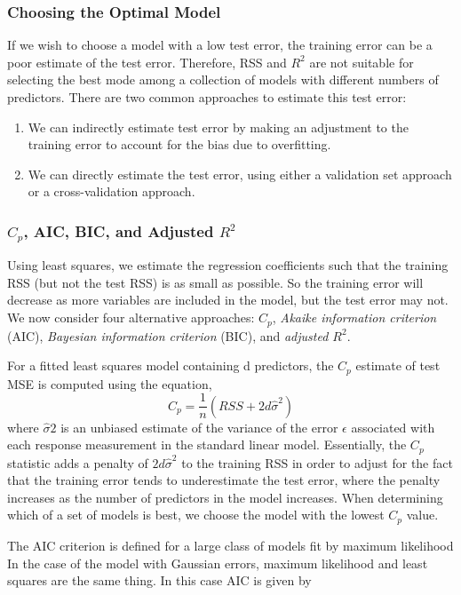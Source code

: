 \documentclass{article}
\numberwithin{equation}{section}
\begin{document}
\begin{enumerate}
\subsubsection{Choosing the Optimal Model}
If we wish to choose a model with a low test error, the training error can be a poor estimate of the test error. Therefore, RSS and $R^2$ are not suitable for selecting the best mode among a collection of models with different numbers of predictors. There are two common approaches to estimate this test error:
\begin{enumerate}
    \item We can indirectly estimate test error by making an adjustment to the training error to account for the bias due to overfitting.
    \item  We can directly estimate the test error, using either a validation set approach or a cross-validation approach.
\end{enumerate}

\subsubsection*{\texorpdfstring{$C_p$}{Cp}, AIC, BIC, and Adjusted \texorpdfstring{$R^2$}{ R2}}
Using least squares, we  estimate the regression coefficients such that the training RSS (but not the test RSS) is as small as possible. So the training error will decrease as more variables are included in the model, but the test error may not. We now consider four alternative approaches: $C_p$, \textit{Akaike information criterion} (AIC), \textit{Bayesian information criterion} (BIC), and \textit{adjusted $R^2$}.

For a fitted least squares model containing d predictors, the $C_p$ estimate of test MSE is computed using the equation,
\begin{equation}
    C_p = \frac{1}{n}(RSS + 2d\hat\sigma^2)
\end{equation}
where $\hat\sigma2$ is an unbiased estimate of the variance of the error $\epsilon$ associated with each response measurement in the standard linear model. Essentially, the $C_p$ statistic adds a penalty of $2d\hat\sigma^2$ to the training RSS in order to adjust for the fact that the training error tends to underestimate the test error, where the penalty increases as the number of predictors in the model increases. When determining which of a set of models is best, we choose the model with the lowest $C_p$ value.

The AIC criterion is defined for a large class of models fit by maximum
likelihood In the case of the model with Gaussian errors, maximum likelihood and least squares are the same thing. In this case AIC is given by


\end{enumerate}
\end{document}
